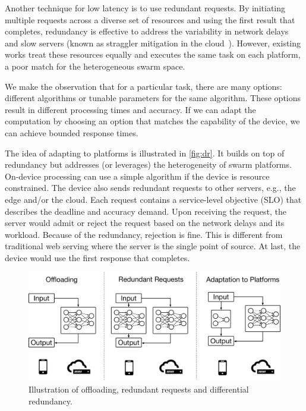 Another technique for low latency is to use redundant requests. By initiating
multiple requests across a diverse set of resources and using the first result
that completes, redundancy is effective to address the variability in network
delays~\cite{gordon2015accelerating, vulimiri2013low} and slow servers (known as
straggler mitigation in the cloud~\cite{dean2013tail,
  ananthanarayanan2013effective}). However, existing works treat these resources
equally and executes the same task on each platform, a poor match for the
heterogeneous swarm space.

We make the observation that for a particular task, there are many options:
different algorithms or tunable parameters for the same algorithm. These options
result in different processing times and accuracy. If we can adapt the
computation by choosing an option that matches the capability of the device, we
can achieve bounded response times.

The idea of adapting to platforms is illustrated in \autoref{fig:dr}. It builds
on top of redundancy but addresses (or leverages) the heterogeneity of swarm
platforms.  On-device processing can use a simple algorithm if the device is
resource constrained. The device also sends redundant requests to other servers,
e.g., the edge and/or the cloud. Each request contains a service-level objective
(SLO) that describes the deadline and accuracy demand. Upon receiving the
request, the server would admit or reject the request based on the network
delays and its workload. Because of the redundancy, rejection is fine. This is
different from traditional web serving where the server is the single point of
source. At last, the device would use the first response that completes.

\begin{figure}
  \centering
  \includegraphics[width=0.8\columnwidth]{figures/dr.pdf}
  \caption{Illustration of offloading, redundant requests and differential
    redundancy.}
  \label{fig:dr}
\end{figure}


